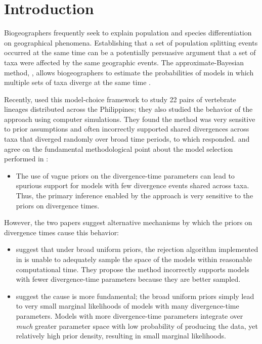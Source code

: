 \section{Introduction}
Biogeographers frequently seek to explain population and species
differentiation on geographical phenomena.
Establishing that a set of population splitting events occurred
at the same time can be a potentially persuasive argument that a set of taxa
were affected by the same geographic events.
The approximate-Bayesian method, \msb, allows biogeographers to estimate the
probabilities of models in which multiple sets of taxa diverge at the same
time \citep{Hickerson2006,Huang2011}.

Recently, \citet{Oaks2012} used this model-choice framework to study 22 pairs
of vertebrate lineages distributed across the Philippines; they also studied
the behavior of the \msb approach using computer simulations.
They found the method was very sensitive to prior assumptions and often
incorrectly supported shared divergences across taxa that diverged randomly
over broad time periods, to which \citet{Hickerson2013} responded.
\citet{Oaks2012} and \citet{Hickerson2013} agree on the fundamental
methodological point about the model selection performed in \msb:
\begin{itemize}
   \item The use of vague priors on the divergence-time parameters can lead to
       spurious support for models with few divergence events shared across
       taxa. Thus, the primary inference enabled by the approach is very
       sensitive to the priors on divergence times.
\end{itemize}
However, the two papers suggest alternative mechanisms by which the priors on
divergence times cause this behavior:
\begin{itemize}
    \item \citet{Hickerson2013} suggest that under broad uniform priors, the
        rejection algorithm implemented in \msb is unable to adequately sample
        the space of the models within reasonable computational time.
        They propose the method incorrectly supports models with fewer
        divergence-time parameters because they are better sampled.
    \item \citet{Oaks2012} suggest the cause is more fundamental; the broad
        uniform priors simply lead to very small marginal likelihoods of models
        with many divergence-time parameters.
        Models with more divergence-time parameters integrate over \emph{much}
        greater parameter space with low probability of producing the data, yet
        relatively high prior density, resulting in small marginal likelihoods.
\end{itemize}
